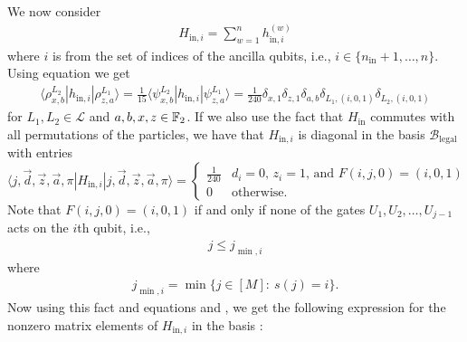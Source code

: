\documentclass[../thesis-main/thesis-main]{subfiles}
\begin{document}
We now consider
\begin{align}
H_{\text{in},i}=\sum_{w=1}^{n}h_{{\text{in}},i}^{(w)}
\end{align}
where $i$ is from the set of indices of the ancilla qubits, i.e., $i\in\{n_{{\text{in}}}+1,\ldots,n\}$. Using equation  we get 
\begin{align}
\langle\rho_{x,b}^{L_{2}}|h_{{\text{in}},i}|\rho_{z,a}^{L_{1}}\rangle=\frac{1}{15}\langle\psi_{x,b}^{L_{2}}|h_{{\text{in}},i}|\psi_{z,a}^{L_{1}}\rangle=\frac{1}{240}\delta_{x,1}\delta_{z,1}\delta_{a,b}\delta_{L_{1},(i,0,1)}\delta_{L_{2},(i,0,1)}
\end{align}
for $L_{1},L_{2}\in\mathcal{L}$ and $a,b,x,z\in\mathbb{F}_2$. If we also use the fact that $H_{\text{in}}$ commutes with all permutations of the particles, we have that $H_{{\text{in}},i}$ is diagonal in the basis $\mathcal{B}_{{\text{legal}}}$ with entries
\begin{equation}
\langle j,\vec{d},\vec{z},\vec{a},\pi|H_{{\text{in}},i}|j,\vec{d},\vec{z},\vec{a},\pi\rangle=\begin{cases}
\frac{1}{240} & \text{$d_{i}=0$, $z_{i}=1$, and $F(i,j,0)=(i,0,1)$} \\
0 & \text{otherwise}.
\end{cases}\label{eq:Hin_i_legalbasis}
\end{equation}
Note that $F(i,j,0)=\left(i,0,1\right)$ if and only if none of the gates $U_{1},U_{2},\ldots,U_{j-1}$ acts on the $i$th qubit, i.e.,
\begin{align}
j\leq j_{\min,i}
\end{align}
where
\begin{align}
j_{\min,i}=\min\{ j\in[M]:\: s(j)=i\}.
\end{align}
Now using this fact and equations  and , we get the following expression for the nonzero matrix elements of $H_{{\text{in}},i}$ in the basis : 
\end{document}
